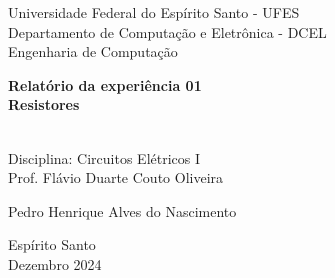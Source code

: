 \begin{titlepage}
    \begin{center}
        \large
        Universidade Federal do Espírito Santo - UFES\\
        Departamento de Computação e Eletrônica - DCEL\\
        Engenharia de Computação
        
        \vfill
        \textbf{
        Relatório da experiência 01\\
        Resistores\\~\\
        }
        
        Disciplina: Circuitos Elétricos I\\
        Prof. Flávio Duarte Couto Oliveira\\
        
        \vfill
        \begin{flushright}
            Pedro Henrique Alves do Nascimento
        \end{flushright}
        
        \vfill
        Espírito Santo\\
        Dezembro 2024
    \end{center}
    \newpage
\end{titlepage}
